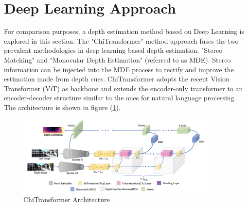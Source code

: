 \documentclass[12pt]{amsart}
\begin{document}
\section*{Deep Learning Approach}
For comparison purposes, a depth estimation method based on Deep Learning is explored in this section. The "ChiTransformer"\cite{chitransformer} method
approach fuses the two prevalent methodologies in deep learning based depth estimation, "Stereo Matching" and "Monocular Depth Estimation" (referred to as MDE). 
Stereo information can be injected into the MDE process to rectify and improve the estimation made from depth cues.
ChiTransformer adopts the recent Vision Transformer (ViT) as backbone and extends the encoder-only transformer to an encoder-decoder structure similar to
the ones for natural language processing.
The architecture is shown in figure (\ref{fig:chi}).
\begin{figure}[h]
    \includegraphics[width=0.9\textwidth]{Chi.png}
    \caption{ChiTransformer Architecture}
    \label{fig:chi}
\end{figure}
\printbibliography
\end{document}

